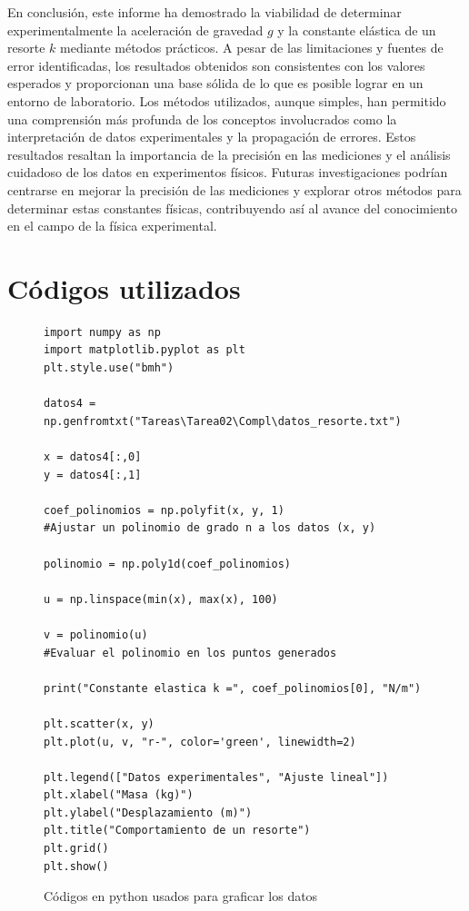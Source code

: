 \documentclass{article}
\begin{document}
\begin{multicols}{2}
    En conclusión, este informe ha demostrado la viabilidad de determinar experimentalmente la aceleración
    de gravedad $g$ y la constante elástica de un resorte $k$ mediante métodos prácticos. A pesar de las
    limitaciones y fuentes de error identificadas, los resultados obtenidos son consistentes con los
    valores esperados y proporcionan una base sólida de lo que es posible lograr en un entorno de 
    laboratorio. Los métodos utilizados, aunque simples, han permitido una comprensión más profunda de 
    los conceptos involucrados como la interpretación de datos experimentales y la propagación de errores.
    Estos resultados resaltan la importancia de la precisión en las mediciones y el análisis cuidadoso
    de los datos en experimentos físicos. Futuras investigaciones podrían centrarse en mejorar la
    precisión de las mediciones y explorar otros métodos para determinar estas constantes físicas,
    contribuyendo así al avance del conocimiento en el campo de la física experimental.

\section*{Códigos utilizados}

\begin{figure}[H]
        \begin{center}
        \begin{adjustbox}{max width=1.0\linewidth}
        \begin{lstlisting}
import numpy as np
import matplotlib.pyplot as plt
plt.style.use("bmh")

datos4 = np.genfromtxt("Tareas\Tarea02\Compl\datos_resorte.txt")

x = datos4[:,0]
y = datos4[:,1]

coef_polinomios = np.polyfit(x, y, 1)
#Ajustar un polinomio de grado n a los datos (x, y)

polinomio = np.poly1d(coef_polinomios)

u = np.linspace(min(x), max(x), 100)

v = polinomio(u)
#Evaluar el polinomio en los puntos generados

print("Constante elastica k =", coef_polinomios[0], "N/m")

plt.scatter(x, y)
plt.plot(u, v, "r-", color='green', linewidth=2)

plt.legend(["Datos experimentales", "Ajuste lineal"])
plt.xlabel("Masa (kg)")
plt.ylabel("Desplazamiento (m)")
plt.title("Comportamiento de un resorte")
plt.grid()
plt.show()
        \end{lstlisting}
        \end{adjustbox}
        \end{center}
    \caption{Códigos en python usados para graficar los datos}
    \label{fig:resorte1}
    \end{figure}


\end{multicols}
\end{document}
